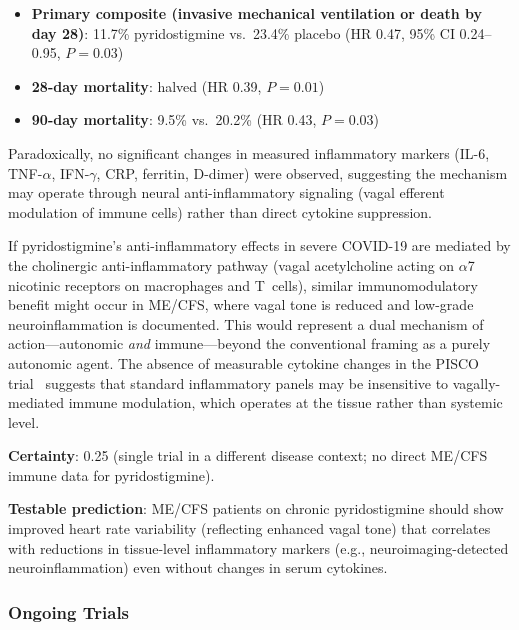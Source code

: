\begin{itemize}
    \item \textbf{Primary composite (invasive mechanical ventilation or death by day 28)}: 11.7\% pyridostigmine vs.\ 23.4\% placebo (HR 0.47, 95\% CI 0.24--0.95, $P=0.03$)
    \item \textbf{28-day mortality}: halved (HR 0.39, $P=0.01$)
    \item \textbf{90-day mortality}: 9.5\% vs.\ 20.2\% (HR 0.43, $P=0.03$)
\end{itemize}

Paradoxically, no significant changes in measured inflammatory markers (IL-6, TNF-$\alpha$, IFN-$\gamma$, CRP, ferritin, D-dimer) were observed, suggesting the mechanism may operate through neural anti-inflammatory signaling (vagal efferent modulation of immune cells) rather than direct cytokine suppression.

\begin{speculation}
\label{spec:pyridostigmine-immunomod}
If pyridostigmine's anti-inflammatory effects in severe COVID-19 are mediated by the cholinergic anti-inflammatory pathway (vagal acetylcholine acting on $\alpha$7 nicotinic receptors on macrophages and T~cells), similar immunomodulatory benefit might occur in ME/CFS, where vagal tone is reduced and low-grade neuroinflammation is documented. This would represent a dual mechanism of action---autonomic \emph{and} immune---beyond the conventional framing as a purely autonomic agent. The absence of measurable cytokine changes in the PISCO trial~\cite{FragosoSaavedra2022pisco} suggests that standard inflammatory panels may be insensitive to vagally-mediated immune modulation, which operates at the tissue rather than systemic level.

\textbf{Certainty}: 0.25 (single trial in a different disease context; no direct ME/CFS immune data for pyridostigmine).

\textbf{Testable prediction}: ME/CFS patients on chronic pyridostigmine should show improved heart rate variability (reflecting enhanced vagal tone) that correlates with reductions in tissue-level inflammatory markers (e.g., neuroimaging-detected neuroinflammation) even without changes in serum cytokines.
\end{speculation}

\subsubsection{Ongoing Trials}

